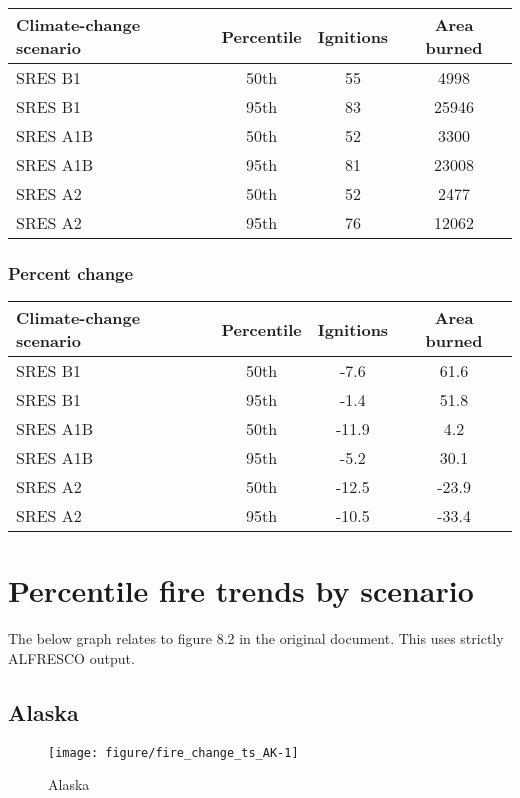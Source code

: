 \documentclass{article}\usepackage[]{graphicx}\usepackage[]{color}
\makeatletter
\def\maxwidth{ %
  \ifdim\Gin@nat@width>\linewidth
    \linewidth
  \else
    \Gin@nat@width
  \fi
}
\newcommand{\headcol}{\rowcolor{tableheadcolor}}
\makeatother
\begin{document}
\begin{table}[ht]
\centering
\begin{tabular}{lccc}
  \headcol 
 \toprule
Climate-change scenario & Percentile & Ignitions & Area burned \\ 
  \midrule
SRES B1 & 50th & 55 & 4998 \\ 
  SRES B1 & 95th & 83 & 25946 \\ 
  SRES A1B & 50th & 52 & 3300 \\ 
  SRES A1B & 95th & 81 & 23008 \\ 
  SRES A2 & 50th & 52 & 2477 \\ 
  SRES A2 & 95th & 76 & 12062 \\ 
   \bottomrule
\end{tabular}
\end{table}


\subsubsection{Percent change}

\begin{table}[ht]
\centering
\begin{tabular}{lccc}
  \headcol 
 \toprule
Climate-change scenario & Percentile & Ignitions & Area burned \\ 
  \midrule
SRES B1 & 50th & -7.6 & 61.6 \\ 
  SRES B1 & 95th & -1.4 & 51.8 \\ 
  SRES A1B & 50th & -11.9 & 4.2 \\ 
  SRES A1B & 95th & -5.2 & 30.1 \\ 
  SRES A2 & 50th & -12.5 & -23.9 \\ 
  SRES A2 & 95th & -10.5 & -33.4 \\ 
   \bottomrule
\end{tabular}
\end{table}


\section{Percentile fire trends by scenario}
The below graph relates to figure 8.2 in the original document.
This uses strictly ALFRESCO output.
\subsection{Alaska}
\begin{figure}[H]
\texttt{[image: figure/fire\_change\_ts\_AK-1]} \caption[Alaska]{Alaska\label{fig:fire_change_ts_AK}}
\end{figure}
\end{document}
